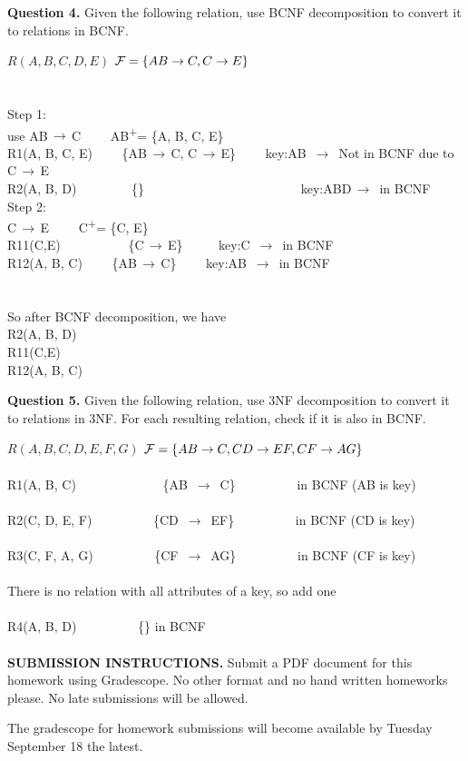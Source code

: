 \documentclass[11pt]{article}
\begin{document}
\newpage

{\bf Question 4.} Given the following relation, use BCNF decomposition
to convert it to relations in BCNF.

$R(A,B,C,D,E)$ ${\cal F}=\{AB\rightarrow C, C\rightarrow E\}$
\\ \\ \\
Step 1:\\
\medskip
use AB$\,\to\,$C \ \ \ \  AB\textsuperscript{+}= \{A, B, C, E\} \\
R1(A, B, C, E) \ \ \ \ \{AB$\,\to\,$C, C$\,\to\,$E\} \ \ \ \ key:AB $\,\to\,$ Not in BCNF due to C$\,\to\,$E \\
R2(A, B, D) \ \ \ \ \ \ \ \ \{\}  \ \ \ \ \ \ \ \ \ \ \ \ \ \ \ \ \ \ \ \ \ \ \ \  key:ABD$\,\to\,$ in BCNF \\

Step 2:\\
\medskip
C$\,\to\,$E \ \ \ \  C\textsuperscript{+}= \{C, E\} \\
R11(C,E) \ \ \ \ \ \ \ \ \ \ \{C$\,\to\,$E\} \ \ \ \ \ key:C $\,\to\,$ in BCNF\\
R12(A, B, C) \ \ \ \ \{AB$\,\to\,$C\} \ \ \ \ key:AB $\,\to\,$ in BCNF\\
\\ \\
So after BCNF decomposition, we have\\
R2(A, B, D) \\ 
R11(C,E) \\
R12(A, B, C)


\newpage

{\bf Question 5.} Given the following relation, use 3NF decomposition
to convert it to relations in 3NF. For each resulting relation, check
if it is also in BCNF.

$R(A,B,C,D,E,F,G)$ ${\cal F}=\{AB\rightarrow C, CD\rightarrow EF, CF\rightarrow AG \}$
\\ \\

R1(A, B, C) \ \ \ \ \ \ \ \ \ \ \ \ \ \{AB $\,\to\,$ C\} \ \ \ \ \ \ \ \ \ in BCNF (AB is key)\\
\\
R2(C, D, E, F)  \ \ \ \ \ \ \ \ \  \{CD $\,\to\,$ EF\} \ \ \ \ \ \ \ \ \ in BCNF (CD is key)\\
\\
R3(C, F, A, G) \ \ \ \ \ \ \ \ \ \{CF $\,\to\,$ AG\} \ \ \ \ \ \ \ \ \ in BCNF (CF is key)\\
\\
There is no relation with all attributes of a key, so add one\\
\\
R4(A, B, D) \ \ \ \ \ \ \ \ \ \{\} in BCNF \\
\\

{\bf SUBMISSION INSTRUCTIONS.} Submit a PDF document for this homework
using Gradescope. No other format and no hand written homeworks
please. No late submissions will be allowed.

The gradescope for homework submissions will become available by
Tuesday September 18 the latest. 
\end{document}
